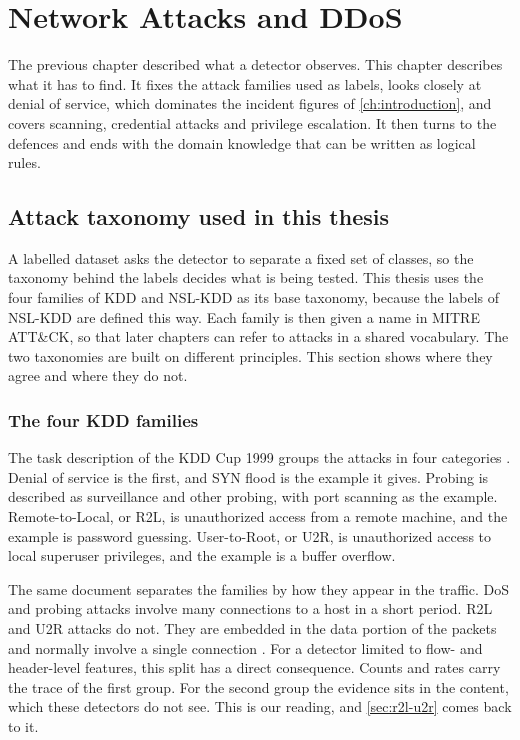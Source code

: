 \chapter{Network Attacks and DDoS}
\label{ch:attacks-ddos}

The previous chapter described what a detector observes. This chapter
describes what it has to find. It fixes the attack families used as labels,
looks closely at denial of service, which dominates the incident figures of
\cref{ch:introduction}, and covers scanning, credential attacks and privilege
escalation. It then turns to the defences and ends with the domain knowledge
that can be written as logical rules.

\section{Attack taxonomy used in this thesis}
\label{sec:attack-taxonomy}

A labelled dataset asks the detector to separate a fixed set of classes, so
the taxonomy behind the labels decides what is being tested. This thesis uses
the four families of KDD and NSL-KDD as its base taxonomy, because the labels
of NSL-KDD are defined this way. Each family is then given a name in MITRE
ATT\&CK, so that later chapters can refer to attacks in a shared vocabulary.
The two taxonomies are built on different principles. This section shows
where they agree and where they do not.

\subsection{The four KDD families}
\label{sec:kdd-families}

The task description of the KDD Cup 1999 groups the attacks in four
categories \citep{kddcup1999task}. Denial of service is the first, and SYN
flood is the example it gives. Probing is described as surveillance and other
probing, with port scanning as the example. Remote-to-Local, or R2L, is
unauthorized access from a remote machine, and the example is password
guessing. User-to-Root, or U2R, is unauthorized access to local superuser
privileges, and the example is a buffer overflow.

The same document separates the families by how they appear in the traffic.
DoS and probing attacks involve many connections to a host in a short period.
R2L and U2R attacks do not. They are embedded in the data portion of the
packets and normally involve a single connection
\citep{kddcup1999task,tavallaee2009kddcup99}. For a detector limited to
flow- and header-level features, this split has a direct consequence. Counts
and rates carry the trace of the first group. For the second group the
evidence sits in the content, which these detectors do not see. This is our
reading, and \cref{sec:r2l-u2r} comes back to it.

